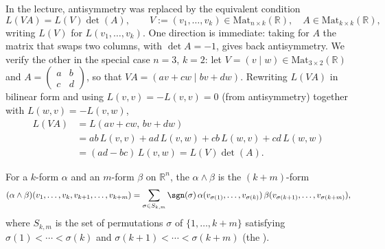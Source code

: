 \begin{remark}
In the lecture, antisymmetry was replaced by the equivalent condition
\[L(VA) = L(V)\det(A), \qquad V := (v_1,\ldots,v_k) \in \mathrm{Mat}_{n\times k}(\mathbb{R}),
  \quad A \in \mathrm{Mat}_{k\times k}(\mathbb{R}),\]
writing $L(V)$ for $L(v_1,\ldots,v_k)$. One direction is immediate: taking for $A$ the matrix
that swaps two columns, with $\det A = -1$, gives back antisymmetry. We verify the other in the
special case $n=3$, $k=2$: let $V = (v\mid w) \in \mathrm{Mat}_{3\times2}(\mathbb{R})$ and $A = \begin{pmatrix} a &
b \\ c & d \end{pmatrix}$, so that $VA = (av+cw \mid bv+dw)$. Rewriting $L(VA)$ in bilinear
form and using $L(v,v) = -L(v,v) = 0$ (from antisymmetry) together with $L(w,v) = -L(v,w)$,
\begin{align}
L(VA) &= L(av+cw,\,bv+dw) \nonumber \\
  &= ab\,L(v,v) + ad\,L(v,w) + cb\,L(w,v) + cd\,L(w,w) \nonumber \\
  &= (ad-bc)\,L(v,w) = L(V)\det(A). \nonumber
\end{align}
\end{remark}

\begin{definition}
\label{def:wedge_product}
For a $k$-form $\alpha$ and an $m$-form $\beta$ on $\mathbb{R}^n$, the 
 $\alpha \wedge \beta$ is the $(k+m)$-form
\[
(\alpha\wedge\beta)(v_1,\ldots,v_k,v_{k+1},\ldots,v_{k+m})
  = \sum_{\sigma \in S_{k,m}} \sgn(\sigma)\,\alpha(v_{\sigma(1)},\ldots,v_{\sigma(k)})\,
    \beta(v_{\sigma(k+1)},\ldots,v_{\sigma(k+m)}),
\]
where $S_{k,m}$ is the set of permutations $\sigma$ of $\{1,\ldots,k+m\}$ satisfying
$\sigma(1) < \cdots < \sigma(k)$ and $\sigma(k+1) < \cdots < \sigma(k+m)$ (the
).
\end{definition}

